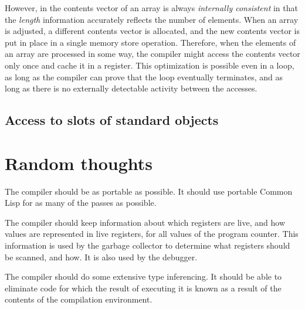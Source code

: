 However, in \sysname{} the contents vector of an array is always
\emph{internally consistent} in that the \emph{length} information
accurately reflects the number of elements.  When an array is
adjusted, a different contents vector is allocated, and the new
contents vector is put in place in a single memory store operation.
Therefore, when the elements of an array are processed in some way,
the compiler might access the contents vector only once and cache it
in a register.  This optimization is possible even in a loop, as long
as the compiler can prove that the loop eventually terminates, and as
long as there is no externally detectable activity between the
accesses. 

\subsection{Access to slots of standard objects}

\section{Random thoughts}

The compiler should be as portable as possible.  It should use
portable Common Lisp for as many of the passes as possible.  

The compiler should keep information about which registers are live,
and how values are represented in live registers, for all values of
the program counter.  This information is used by the garbage
collector to determine what registers should be scanned, and how.   It
is also used by the debugger.  

The compiler should do some extensive type inferencing.  It should be
able to eliminate code for which the result of executing it is known
as a result of the contents of the compilation environment.  


